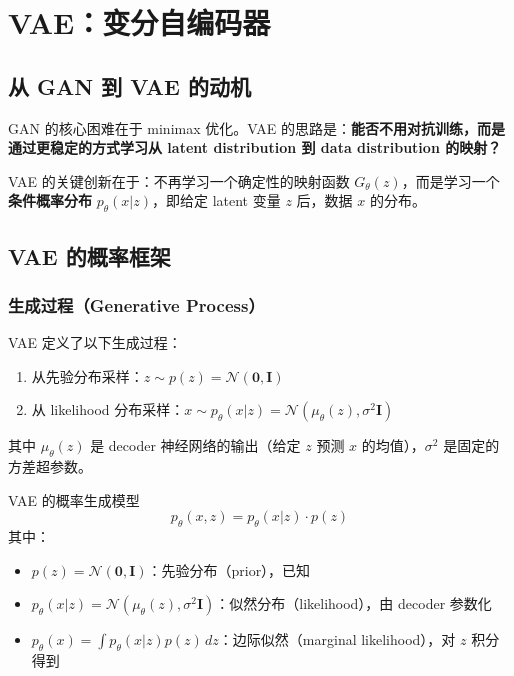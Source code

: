 \section{VAE：变分自编码器}

\subsection{从 GAN 到 VAE 的动机}

GAN 的核心困难在于 minimax 优化。VAE 的思路是：\textbf{能否不用对抗训练，而是通过更稳定的方式学习从 latent distribution 到 data distribution 的映射？}

VAE 的关键创新在于：不再学习一个确定性的映射函数 $G_\theta(z)$，而是学习一个\textbf{条件概率分布} $p_\theta(x|z)$，即给定 latent 变量 $z$ 后，数据 $x$ 的分布。

\subsection{VAE 的概率框架}

\subsubsection{生成过程（Generative Process）}

VAE 定义了以下生成过程：

\begin{enumerate}
    \item 从先验分布采样：$z \sim p(z) = \mathcal{N}(\mathbf{0}, \mathbf{I})$
    \item 从 likelihood 分布采样：$x \sim p_\theta(x|z) = \mathcal{N}(\mu_\theta(z), \sigma^2 \mathbf{I})$
\end{enumerate}

其中 $\mu_\theta(z)$ 是 decoder 神经网络的输出（给定 $z$ 预测 $x$ 的均值），$\sigma^2$ 是固定的方差超参数。

\begin{importantbox}{VAE 的概率生成模型}
$$p_\theta(x, z) = p_\theta(x|z) \cdot p(z)$$
其中：
\begin{itemize}
    \item $p(z) = \mathcal{N}(\mathbf{0}, \mathbf{I})$：先验分布（prior），已知
    \item $p_\theta(x|z) = \mathcal{N}(\mu_\theta(z), \sigma^2 \mathbf{I})$：似然分布（likelihood），由 decoder 参数化
    \item $p_\theta(x) = \int p_\theta(x|z) p(z) \, dz$：边际似然（marginal likelihood），对 $z$ 积分得到
\end{itemize}
\end{importantbox}

